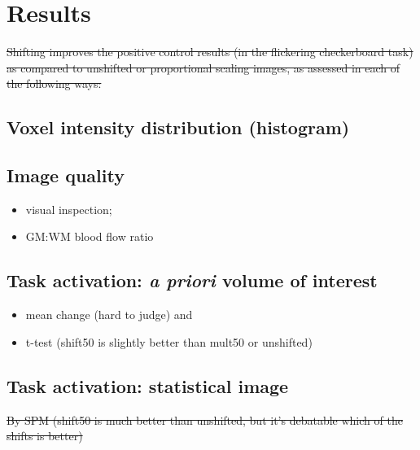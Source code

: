 \section{Results}

\sout{Shifting improves the positive control results (in the flickering checkerboard task) as compared to unshifted or proportional scaling images, as assessed in each of the following ways:}

\subsection{Voxel intensity distribution (histogram)}

\subsection{Image quality}
  \begin{itemize}
  \item visual inspection;
  \item GM:WM blood flow ratio
  \end{itemize}

\subsection{Task activation: \textit{a priori} volume of interest}
  \begin{itemize} 
    \item mean change (hard to judge) and 
    \item t-test (shift50 is slightly better than mult50 or unshifted)
  \end{itemize}

\subsection{Task activation: statistical image}
\sout{By SPM (shift50 is much better than unshifted, but it's debatable which of the shifts is better)}


